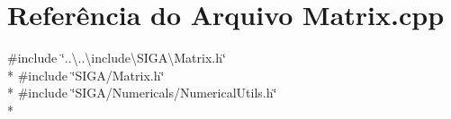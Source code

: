 \section{Referência do Arquivo Matrix.\+cpp}
\label{_matrix_8cpp}
{\ttfamily \#include \char`\"{}..\textbackslash{}..\textbackslash{}include\textbackslash{}\+S\+I\+G\+A\textbackslash{}\+Matrix.\+h\char`\"{}}\\*
{\ttfamily \#include \char`\"{}S\+I\+G\+A/\+Matrix.\+h\char`\"{}}\\*
{\ttfamily \#include \char`\"{}S\+I\+G\+A/\+Numericals/\+Numerical\+Utils.\+h\char`\"{}}\\*
